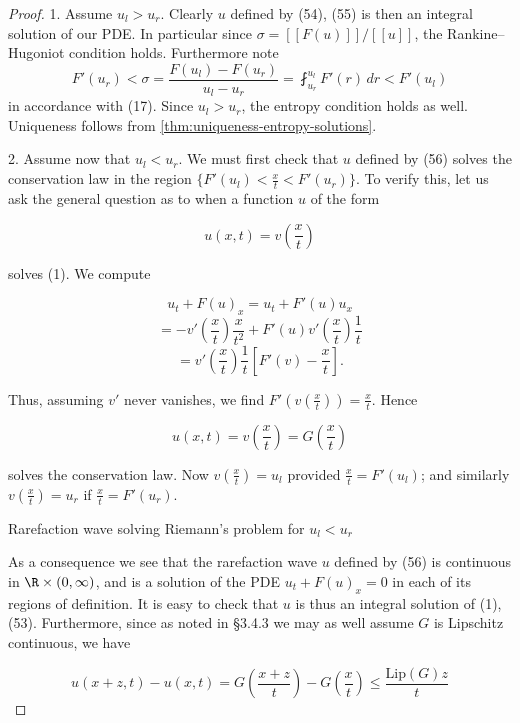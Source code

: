 \begin{proof}
1. Assume $u_l > u_r$. Clearly $u$ defined by (54), (55) is then an integral solution of our PDE. In particular since $\sigma = [[F(u)]]/[[u]]$, the Rankine--Hugoniot condition holds. Furthermore note
$$F'(u_r) < \sigma = \frac{F(u_l)-F(u_r)}{u_l-u_r} = \fint_{u_r}^{u_l} F'(r)\,dr < F'(u_l)$$
in accordance with (17). Since $u_l > u_r$, the entropy condition holds as well. Uniqueness follows from \cref{thm:uniqueness-entropy-solutions}.

2. Assume now that $u_l < u_r$. We must first check that $u$ defined by (56) solves the conservation law in the region $\{F'(u_l) < \frac{x}{t} < F'(u_r)\}$. To verify this, let us ask the general question as to when a function $u$ of the form

$$u(x,t) = v\left(\frac{x}{t}\right)$$

solves (1). We compute

$$u_t + F(u)_x = u_t + F'(u)u_x$$
$$= -v'\left(\frac{x}{t}\right) \frac{x}{t^2} + F'(u)v'\left(\frac{x}{t}\right) \frac{1}{t}$$
$$= v'\left(\frac{x}{t}\right) \frac{1}{t} \left[F'(v) - \frac{x}{t}\right].$$

Thus, assuming $v'$ never vanishes, we find $F'\left(v\left(\frac{x}{t}\right)\right) = \frac{x}{t}$. Hence

$$u(x,t) = v\left(\frac{x}{t}\right) = G\left(\frac{x}{t}\right)$$

solves the conservation law. Now $v\left(\frac{x}{t}\right) = u_l$ provided $\frac{x}{t} = F'(u_l)$; and similarly $v\left(\frac{x}{t}\right) = u_r$ if $\frac{x}{t} = F'(u_r)$.

\begin{figure}[h]\centering
\end{figure}

Rarefaction wave solving Riemann's problem for $u_l < u_r$

As a consequence we see that the rarefaction wave $u$ defined by (56) is continuous in $\R \times (0, \infty)$, and is a solution of the PDE $u_t + F(u)_x = 0$ in each of its regions of definition. It is easy to check that $u$ is thus an integral solution of (1), (53). Furthermore, since as noted in \S3.4.3 we may as well assume $G$ is Lipschitz continuous, we have

$$u(x+z,t) - u(x,t) = G\left(\frac{x+z}{t}\right) - G\left(\frac{x}{t}\right) \leq \frac{\text{Lip}(G)z}{t}$$
\end{proof}

